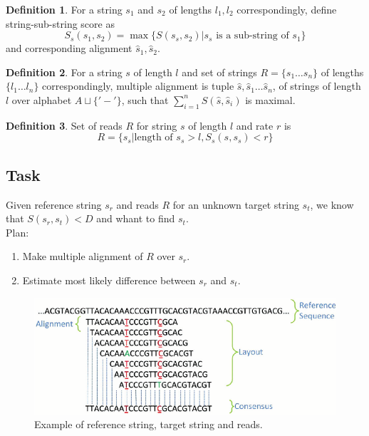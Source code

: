 \documentclass[a4paper, 12pt]{article}
\theoremstyle{definition}
\newtheorem{definition}{Definition}[section]
\theoremstyle{definition}
\theoremstyle{remark}
\begin{document}
\begin{definition}
    For a string $s_1$ and $s_2$ of lengths $l_1, l_2$ correspondingly, define string-sub-string score as 
    $$ S_s (s_1, s_2) = \max \{ S(s_s, s_2) | s_s \text{ is a sub-string of } s_1 \}$$
    and corresponding alignment $\hat{s}_1, \hat{s}_2$.
\end{definition}

\begin{definition}
    For a string $s$ of length $l$ and set of strings $R = \{ s_1 \ldots s_n \}$ 
    of lengths $\{ l_1 \ldots l_n \}$ correspondingly, 
    multiple alignment is tuple $\hat{s}, \hat{s}_1 \ldots \hat{s}_n$, 
    of strings of length $l$ over alphabet $A \sqcup \{ '-' \}$, such that $\sum_{i = 1}^n S(\hat{s}, \hat{s}_i)$ is maximal.
\end{definition}

\begin{definition}
    Set of reads $R$ for string $s$ of length $l$ and rate $r$ is 
    $$ R = \{ s_s | \text{length of } s_s > l, S_s(s, s_s) < r \}$$
\end{definition}

\subsection{Task}
Given reference string $s_r$ and reads $R$ for an unknown target string $s_t$, 
we know that $S(s_r, s_t) < D$ and whant to find $s_t$. \\

Plan:
\begin{enumerate}
    \item Make multiple alignment of $R$ over $s_r$.
    \item Estimate most likely difference between $s_r$ and $s_t$.
\end{enumerate}

\begin{figure}[H]
    \includegraphics[scale=0.5]{aligned_reads.png}
    \centering
    \caption{Example of reference string, target string and reads.}
\end{figure}
\end{document}
